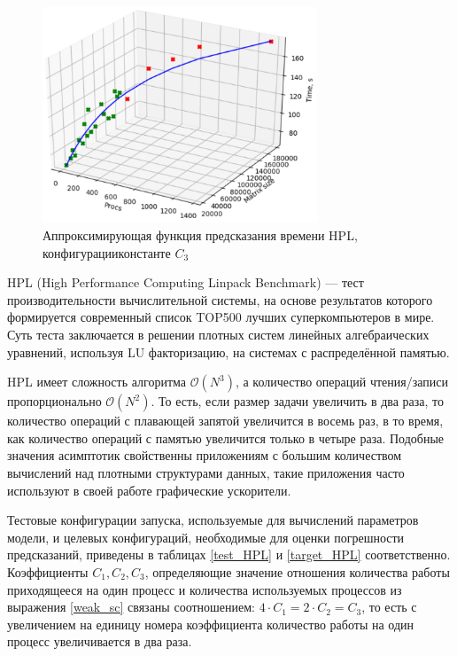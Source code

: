 		\begin{figure}
			\centering
			\includegraphics[width=0.73\textwidth]{./images/fig_hpl_k3}
			\caption{Аппроксимирующая функция предсказания времени HPL, конфигурации константе \(C_3\)}
			\label{figure_HPL_C_3}
		\end{figure}
		HPL (High Performance Computing Linpack Benchmark) — тест производительности вычислительной системы, на основе результатов которого формируется современный список TOP500 \cite{top500} лучших суперкомпьютеров в мире. Суть теста заключается в решении плотных систем линейных алгебраических уравнений, используя LU факторизацию, на системах с распределённой памятью.

		HPL имеет сложность алгоритма \(\mathcal{O}(N^3)\), а количество операций чтения/записи пропорционально \(\mathcal{O}(N^2)\). То есть, если размер задачи увеличить в два раза, то количество операций с плавающей запятой увеличится в восемь раз, в то время, как количество операций с памятью увеличится только в четыре раза. Подобные значения асимптотик свойственны приложениям с большим количеством вычислений над плотными структурами данных, такие приложения часто используют в своей работе графические ускорители.

		Тестовые конфигурации запуска, используемые для вычислений параметров модели, и целевых конфигураций, необходимые для оценки погрешности предсказаний, приведены в таблицах \eqref{test_HPL} и \eqref{target_HPL} соответственно. Коэффициенты \(C_1, C_2, C_3\), определяющие значение отношения количества работы приходящееся на один процесс и количества используемых процессов из выражения \eqref{weak_sc} связаны соотношением: \(4 \cdot C_1 = 2 \cdot C_2 = C_3 \), то есть с увеличением на единицу номера коэффициента количество работы на один процесс увеличивается в два раза.

